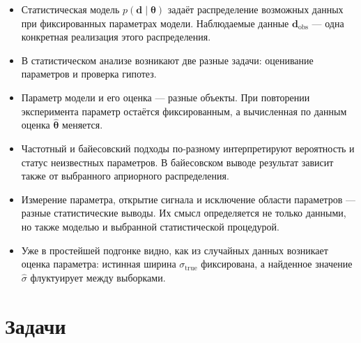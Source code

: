 \documentclass[
  russian,
  11pt,
  a4paper,
  open=any]{scrbook}
\begin{document}
\begin{bookchaptersummary}

\begin{itemize}
\item
  Статистическая модель \(p(\mathbf d\mid\boldsymbol{\theta})\) задаёт
  распределение возможных данных при фиксированных параметрах модели.
  Наблюдаемые данные \(\mathbf d_{\mathrm{obs}}\) --- одна конкретная
  реализация этого распределения.
\item
  В статистическом анализе возникают две разные задачи: оценивание
  параметров и проверка гипотез.
\item
  Параметр модели и его оценка --- разные объекты. При повторении
  эксперимента параметр остаётся фиксированным, а вычисленная по данным
  оценка \(\widehat{\boldsymbol{\theta}}\) меняется.
\item
  Частотный и байесовский подходы по-разному интерпретируют вероятность
  и статус неизвестных параметров. В байесовском выводе результат
  зависит также от выбранного априорного распределения.
\item
  Измерение параметра, открытие сигнала и исключение области параметров
  --- разные статистические выводы. Их смысл определяется не только
  данными, но также моделью и выбранной статистической процедурой.
\item
  Уже в простейшей подгонке видно, как из случайных данных возникает
  оценка параметра: истинная ширина \(\sigma_{\mathrm{true}}\)
  фиксирована, а найденное значение \(\widehat{\sigma}\) флуктуирует
  между выборками.
\end{itemize}

\end{bookchaptersummary}

\section{Задачи}\label{ux437ux430ux434ux430ux447ux438}
\end{document}
